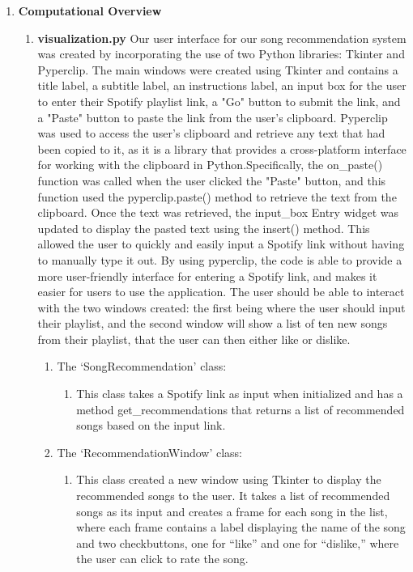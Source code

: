 \documentclass[fontsize=11pt]{article}
\begin{document}
\begin{enumerate}
\begin{enumerate}
    \end{enumerate}

\item\textbf{Computational Overview}
    \begin{enumerate}
    \item\textbf{visualization.py} \newline
        Our user interface for our song recommendation system was created by incorporating the use of two Python libraries: Tkinter and Pyperclip. The main windows were created using Tkinter and contains a title label, a subtitle label, an instructions label, an input box for the user to enter their Spotify playlist link, a "Go" button to submit the link, and a "Paste" button to paste the link from the user's clipboard. Pyperclip was used to access the user's clipboard and retrieve any text that had been copied to it, as it is a library that provides a cross-platform interface for working with the clipboard in Python.Specifically, the on\_paste() function was called when the user clicked the "Paste" button, and this function used the pyperclip.paste() method to retrieve the text from the clipboard. Once the text was retrieved, the input\_box Entry widget was updated to display the pasted text using the insert() method. This allowed the user to quickly and easily input a Spotify link without having to manually type it out. By using pyperclip, the code is able to provide a more user-friendly interface for entering a Spotify link, and makes it easier for users to use the application. The user should be able to interact with the two windows created: the first being where the user should input their playlist, and the second window will show a list of ten new songs from their playlist, that the user can then either like or dislike. \\
        \begin{enumerate}
            \item {The ‘SongRecommendation’ class:}
            \begin{enumerate}
                \item This class takes a Spotify link as input when initialized and has a method get\_recommendations that returns a list of recommended songs based on the input link. \\
            \end{enumerate}
            
            \item {The ‘RecommendationWindow’ class:}
            \begin{enumerate}
                \item This class created a new window using Tkinter to display the recommended songs to the user. It takes a list of recommended songs as its input and creates a frame for each song in the list, where each frame contains a label displaying the name of the song and two checkbuttons, one for “like” and one for “dislike,” where the user can click to rate the song.


\end{enumerate}
\end{enumerate}
\end{enumerate}
\end{enumerate}
\end{document}
